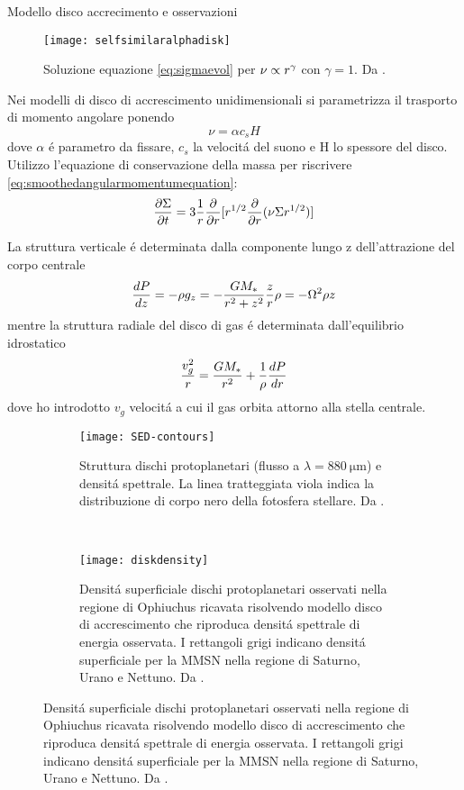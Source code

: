 \begin{reworking}{Modello disco accrecimento e osservazioni}
	\begin{wrapfigure}[17]{l}{0.5\textwidth}
		\texttt{[image: selfsimilaralphadisk]}
		\caption{Soluzione equazione \eqref{eq:sigmaevol} per $\nu\propto r\expy{\gamma}$ con $\gamma=1$. Da \cite{armitage2007lecture}.}\label{fig:selfsimilaralphadisk}
	\end{wrapfigure}
	
	Nei modelli di disco di accrescimento unidimensionali si parametrizza il trasporto di momento angolare ponendo
	\begin{equation}
	\nu=\alpha c_s H
	\end{equation}
	dove $\alpha$ \'e parametro da fissare, $c_s$ la velocit\'a del suono e H lo spessore del disco. Utilizzo l'equazione di conservazione della massa per riscrivere \eqref{eq:smoothedangularmomentumequation}:
	\begin{equation}
	\PDy{t}{\Sigma}=3\frac{1}{r}\PDof{r}[r\expy{1/2}\PDof{r}(\nu\Sigma r\expy{1/2})]\label{eq:sigmaevol}
	\end{equation}
	
	La struttura verticale \'e determinata dalla componente lungo z dell'attrazione del corpo centrale
	\begin{equation}
	\TDy{z}{P}=-\rho g_z=-\frac{GM_*}{r^2+z^2}\frac{z}{r}\rho=-\Omega^2\rho z
	\end{equation}
	mentre la struttura radiale del disco di gas \'e determinata dall'equilibrio idrostatico
	\begin{equation}
	\frac{v_g^2}{r}=\frac{GM_*}{r^2}+\frac{1}{\rho}\TDy{r}{P}
	\end{equation}
	dove ho introdotto $v_g$ velocit\'a a cui il gas orbita attorno alla stella centrale.
	
	\begin{figure}[!ht]
		\begin{subfigure}[b]{0.39\textwidth}
			\centering
			\texttt{[image: SED-contours]}
			\caption{Struttura dischi protoplanetari (flusso a $\lambda=\SI{880}{\micro\meter}$) e densit\'a spettrale. La linea tratteggiata viola indica la distribuzione di corpo nero della fotosfera stellare. Da \cite{andrews2010protoplanetary}.}\label{fig:SED-contours}
		\end{subfigure}
		~
		\begin{subfigure}[b]{0.55\textwidth}
			\texttt{[image: diskdensity]}
			\caption{Densit\'a superficiale dischi protoplanetari osservati nella regione di Ophiuchus ricavata risolvendo modello disco di accrescimento che riproduca densit\'a spettrale di energia osservata. I rettangoli grigi indicano densit\'a superficiale per la MMSN nella regione di Saturno, Urano e Nettuno. Da \cite{andrews2010protoplanetary}.}\label{fig:diskdensity}
		\end{subfigure}
	\end{figure}
	

\end{reworking}
